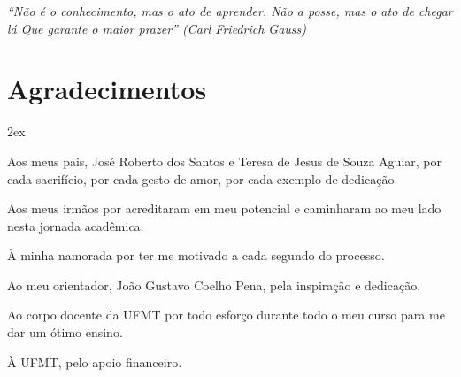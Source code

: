 %
%


\begin{titlepage}

\vspace*{\fill}

\hfill
\begin{minipage}{0.5\linewidth}
\begin{flushright}
\large\it
``Não é o conhecimento, mas o ato de aprender.
Não a posse, mas o ato de chegar lá
Que garante o maior prazer''
(Carl Friedrich Gauss)
\end{flushright}
\end{minipage}

\vspace*{\fill}

\end{titlepage}

\chapter*{Agradecimentos}
\thispagestyle{empty}

\begin{trivlist}  \itemsep 2ex

\item Aos meus pais, José Roberto dos Santos e Teresa de Jesus de Souza Aguiar, por cada sacrifício, por cada gesto de amor, por cada exemplo de dedicação. 

\item Aos meus irmãos por acreditaram em meu potencial e caminharam ao meu lado nesta jornada acadêmica. 

\item À minha namorada por ter me motivado a cada segundo do processo.

\item Ao meu orientador, João Gustavo Coelho Pena, pela inspiração e dedicação.

\item Ao corpo docente da UFMT por todo esforço durante todo o meu curso para me dar um ótimo ensino.

\item À UFMT, pelo apoio financeiro.

\end{trivlist}

